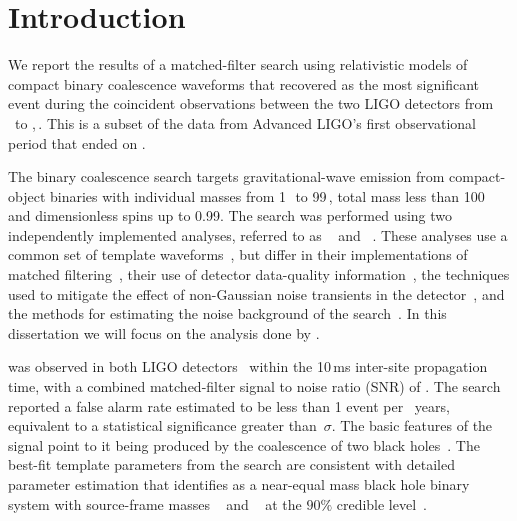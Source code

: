 
\section{Introduction}
\label{s:intro}
We report the results of a matched-filter
search using relativistic models of compact binary coalescence waveforms that
recovered \TheEvent{} as the most significant event during the coincident
observations between the two LIGO detectors from \OBSSTART\ to
\OBSEND,\,\OBSYEAR. This is a subset of the data from Advanced LIGO's first
observational period that ended on \OoneEND. 

The binary coalescence search targets gravitational-wave emission from
compact-object binaries with individual masses from 1$\,$\Msun\, to
99$\,$\Msun, total mass less than 100$\,$\Msun\, and dimensionless spins up to
0.99. The search was performed using two independently implemented analyses,
referred to as \pycbc{}~\cite{Canton:2014ena,Usman:2015kfa,pycbc-github} and
\gstlal{}~\cite{Cannon:2011vi,Privitera:2013xza,gstlal-methods}.
These
analyses use a common set of template
waveforms~\cite{Taracchini:2013rva,Purrer:2015tud,Capano:2016uif}, but differ
in their implementations of matched
filtering~\cite{Allen:2005fk,Cannon:2010qh}, their use of detector
data-quality information~\cite{GW150914-DETCHAR}, the techniques used to
mitigate the effect of non-Gaussian noise transients in the
detector~\cite{Allen:2004gu,Cannon:2011vi}, and the methods for estimating the
noise background of the search~\cite{Usman:2015kfa,Cannon:2015gha}. In this
dissertation we will focus on the analysis done by \pycbc{}. 

\TheEvent{} was observed in both LIGO detectors~\cite{GW150914-DETECTORS}
within the 10\,ms inter-site propagation time, with a combined matched-filter
signal to noise ratio (SNR) of \OBSEVENTAPPROXCOMBINEDSNR.  The search
reported a false alarm rate estimated to be less than 1 event per
\CBCEVENTIFAR~years, equivalent to a statistical significance greater than
\CBCEVENTSIGMA\,$\sigma$.  The basic features of the \TheEvent{} signal point
to it being produced by the coalescence of two black
holes~\cite{GW150914-DETECTION}.  The best-fit template parameters from the
search are consistent with detailed parameter estimation that identifies
\TheEvent{} as a near-equal mass black hole binary system with source-frame
masses {\MONESCOMPACT~\Msun} and {\MTWOSCOMPACT~\Msun} at the $90\%$ credible
level~\cite{GW150914-PARAMESTIM}.

